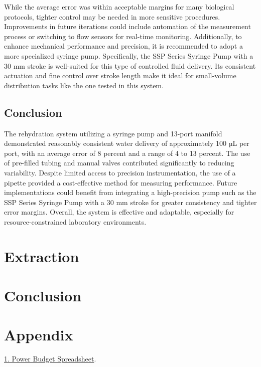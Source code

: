 \documentclass[12pt]{article}
\begin{document}
        While the average error was within acceptable margins for many biological protocols, tighter control may be needed in more sensitive procedures. Improvements in future iterations could include automation of the measurement process or switching to flow sensors for real-time monitoring. Additionally, to enhance mechanical performance and precision, it is recommended to adopt a more specialized syringe pump. Specifically, the SSP Series Syringe Pump with a 30 mm stroke is well-suited for this type of controlled fluid delivery. Its consistent actuation and fine control over stroke length make it ideal for small-volume distribution tasks like the one tested in this system.
    
    \subsection{Conclusion}
        The rehydration system utilizing a syringe pump and 13-port manifold demonstrated reasonably consistent water delivery of approximately 100 µL per port, with an average error of 8 percent and a range of 4 to 13 percent. The use of pre-filled tubing and manual valves contributed significantly to reducing variability. Despite limited access to precision instrumentation, the use of a pipette provided a cost-effective method for measuring performance. Future implementations could benefit from integrating a high-precision pump such as the SSP Series Syringe Pump with a 30 mm stroke for greater consistency and tighter error margins. Overall, the system is effective and adaptable, especially for resource-constrained laboratory environments.
    
    \section{Extraction}
    







\section{Conclusion}

    


\section{Appendix}

\href{https://docs.google.com/spreadsheets/d/1zga7t0Z7vdd-e0fAlvdngkhm1gBsFoFq/edit?usp=sharing&ouid=111594997472455245073&rtpof=true&sd=true}{1. Power Budget Spreadsheet}.
\end{document}
